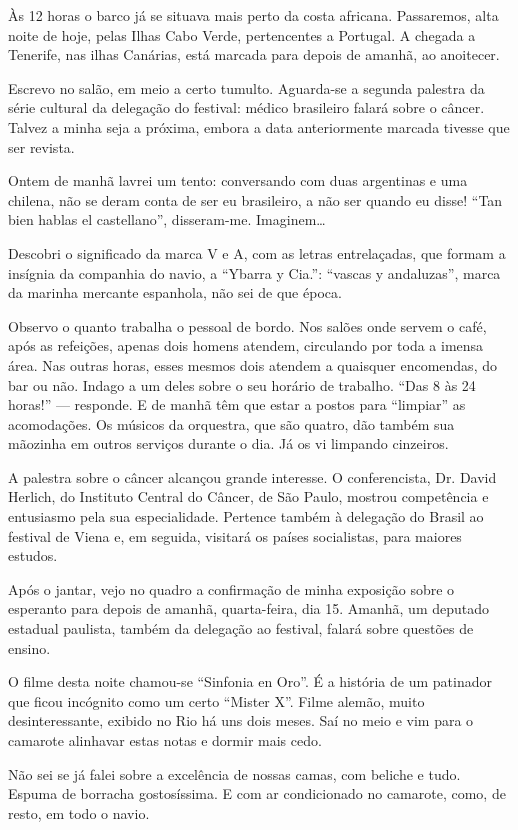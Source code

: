 Às 12 horas o barco já se situava mais perto da costa africana. Passaremos, alta noite de hoje, pelas Ilhas Cabo Verde, pertencentes a Portugal. A chegada a Tenerife, nas ilhas Canárias, está marcada para depois de amanhã, ao anoitecer.

Escrevo no salão, em meio a certo tumulto. Aguarda-se a segunda palestra da série cultural da delegação do festival: médico brasileiro falará sobre o câncer. Talvez a minha seja a próxima, embora a data anteriormente marcada tivesse que ser revista.

Ontem de manhã lavrei um tento: conversando com duas argentinas e uma chilena, não se deram conta de ser eu brasileiro, a não ser quando eu disse! ``Tan bien hablas el castellano'', disseram-me. Imaginem\ldots

Descobri o significado da marca V e A, com as letras entrelaçadas, que formam a insígnia da companhia do navio, a ``Ybarra y Cia.'': ``vascas y andaluzas'', marca da marinha mercante espanhola, não sei de que época.

Observo o quanto trabalha o pessoal de bordo. Nos salões onde servem o café, após as refeições, apenas dois homens atendem, circulando por toda a imensa área. Nas outras horas, esses mesmos dois atendem a quaisquer encomendas, do bar ou não. Indago a um deles sobre o seu horário de trabalho. ``Das 8 às 24 horas!'' --- responde. E de manhã têm que estar a postos para ``limpiar'' as acomodações. Os músicos da orquestra, que são quatro, dão também sua mãozinha em outros serviços durante o dia. Já os vi limpando cinzeiros.

A palestra sobre o câncer alcançou grande interesse. O conferencista, Dr. David Herlich, do Instituto Central do Câncer, de São Paulo, mostrou competência e entusiasmo pela sua especialidade. Pertence também à delegação do Brasil ao festival de Viena e, em seguida, visitará os países socialistas, para maiores estudos.

Após o jantar, vejo no quadro a confirmação de minha exposição sobre o esperanto para depois de amanhã, quarta-feira, dia 15. Amanhã, um deputado estadual paulista, também da delegação ao festival, falará sobre questões de ensino.

O filme desta noite chamou-se ``Sinfonia en Oro''. É a história de um patinador que ficou incógnito como um certo ``Mister X''. Filme alemão, muito desinteressante, exibido no Rio há uns dois meses. Saí no meio e vim para o camarote alinhavar estas notas e dormir mais cedo.

Não sei se já falei sobre a excelência de nossas camas, com beliche e tudo. Espuma de borracha gostosíssima. E com ar condicionado no camarote, como, de resto, em todo o navio.

